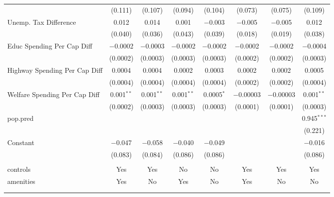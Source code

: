 \begin{table}[!htbp]
\begin{tabular}{@{\extracolsep{5pt}}lccccccc}
  & (0.111) & (0.107) & (0.094) & (0.104) & (0.073) & (0.075) & (0.109) \\ 
  Unemp. Tax Difference & 0.012 & 0.014 & 0.001 & $-$0.003 & $-$0.005 & $-$0.005 & 0.012 \\ 
  & (0.040) & (0.036) & (0.043) & (0.039) & (0.018) & (0.019) & (0.038) \\ 
  Educ Spending Per Cap Diff & $-$0.0002 & $-$0.0003 & $-$0.0002 & $-$0.0002 & $-$0.0002 & $-$0.0002 & $-$0.0004 \\ 
  & (0.0002) & (0.0003) & (0.0003) & (0.0003) & (0.0002) & (0.0002) & (0.0003) \\ 
  Highway Spending Per Cap Diff & 0.0004 & 0.0004 & 0.0002 & 0.0003 & 0.0002 & 0.0002 & 0.0005 \\ 
  & (0.0004) & (0.0004) & (0.0004) & (0.0004) & (0.0002) & (0.0002) & (0.0004) \\ 
  Welfare Spending Per Cap Diff & 0.001$^{**}$ & 0.001$^{**}$ & 0.001$^{**}$ & 0.0005$^{*}$ & $-$0.00003 & $-$0.00003 & 0.001$^{**}$ \\ 
  & (0.0002) & (0.0003) & (0.0003) & (0.0003) & (0.0001) & (0.0001) & (0.0003) \\ 
  pop.pred &  &  &  &  &  &  & 0.945$^{***}$ \\ 
  &  &  &  &  &  &  & (0.221) \\ 
  Constant & $-$0.047 & $-$0.058 & $-$0.040 & $-$0.049 &  &  & $-$0.016 \\ 
  & (0.083) & (0.084) & (0.086) & (0.086) &  &  & (0.086) \\ 
 \hline \\[-1.8ex] 
controls & Yes & Yes & No & No & Yes & Yes & Yes \\ 
amenities & Yes & No & Yes & No & Yes & No & No \\ 
\hline \\[-1.8ex] 
\hline 
\hline \\[-1.8ex] 
\end{tabular} 
\end{table} 
